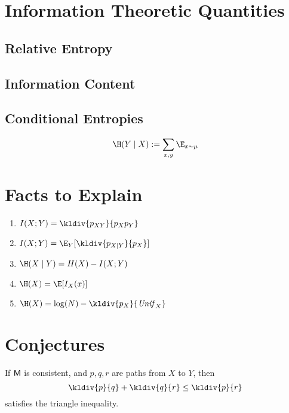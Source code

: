 \documentclass{article}
\begin{document}
    \section{Information Theoretic Quantities}
    
    \subsection{Relative Entropy}
    
    \subsection{Information Content}
    
    \subsection{Conditional Entropies}
    \begin{center}
    \end{center}
    
    \[ \H(Y \mid X) := \sum_{x,y}  \E_{x \sim \mu} \]
    
    
    
    \section{Facts to Explain}
    \begin{enumerate}
        \item $I(X ; Y) = \kldiv{p_{XY}}{p_X p_Y}$
        \item $I(X ; Y) = \E_Y [\kldiv{p_{X|Y}}{p_X}] $ 
        \item $\H(X \mid Y) = H(X) - I(X;Y)$
        \item $\H(X) = \E[ I_X(x) ]$
        \item $\H(X) = \log(N) - \kldiv{p_X}{\mathit{Unif}_X}$
    \end{enumerate}
    
    \section{Conjectures}
    
    \begin{conj}
        If $\sf M$ is consistent, and $p, q, r$ are paths from $X$ to $Y$, then 
        \[ \kldiv{p}{q} + \kldiv{q}{r} \leq \kldiv{p}{r} \]
        satisfies the triangle inequality.
    \end{conj}
    
\end{document}

